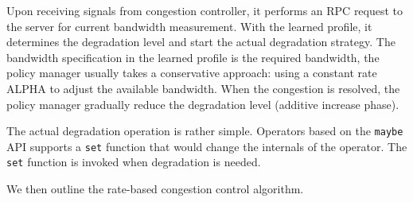  Upon receiving signals from congestion controller, it
performs an RPC request to the server for current bandwidth measurement. With
the learned profile, it determines the degradation level and start the actual
degradation strategy. The bandwidth specification in the learned profile is the
required bandwidth, the policy manager usually takes a conservative approach:
using a constant rate ALPHA to adjust the available bandwidth. When the
congestion is resolved, the policy manager gradually reduce the degradation
level (additive increase phase).

 The actual degradation operation is rather simple. Operators
based on the \texttt{maybe} API supports a \texttt{set} function that would
change the internals of the operator. The \texttt{set} function is invoked when
degradation is needed.

We then outline the rate-based congestion control algorithm.

